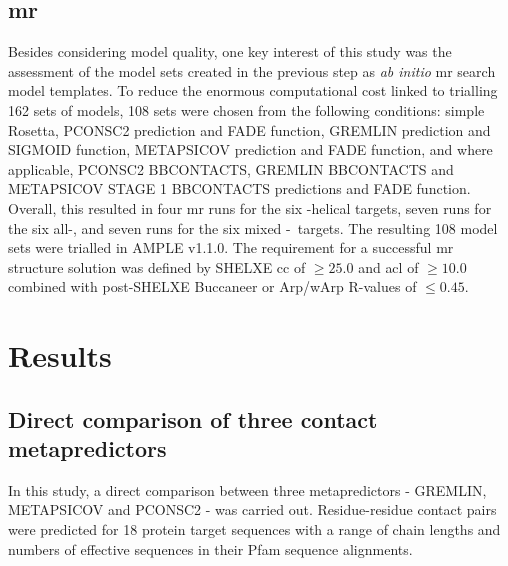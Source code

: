 \subsection{\acrlong{mr}}
Besides considering model quality, one key interest of this study was the assessment of the model sets created in the previous step as \textit{ab initio} \gls{mr} search model templates. To reduce the enormous computational cost linked to trialling 162 sets of models, 108 sets were chosen from the following conditions: simple Rosetta, PCONSC2 prediction and FADE function, GREMLIN prediction and SIGMOID function, METAPSICOV prediction and FADE function, and where applicable, PCONSC2 BBCONTACTS, GREMLIN BBCONTACTS and METAPSICOV STAGE 1 BBCONTACTS predictions and FADE function. Overall, this resulted in four \gls{mr} runs for the six \textalpha-helical targets, seven runs for the six all-\textbeta, and seven runs for the six mixed \textalpha-\textbeta\ targets. The resulting 108 model sets were trialled in AMPLE v1.1.0. The requirement for a successful \gls{mr} structure solution was defined by SHELXE \gls{cc} of $\geq25.0$ and \gls{acl} of $\geq10.0$ combined with post-SHELXE Buccaneer \cite{} or Arp/wArp \cite{} R-values of $\leq0.45$.

\section{Results}
\subsection{Direct comparison of three contact metapredictors}
In this study, a direct comparison between three metapredictors - GREMLIN, METAPSICOV and PCONSC2 - was carried out. Residue-residue contact pairs were predicted for 18 protein target sequences with a range of chain lengths and numbers of effective sequences in their Pfam sequence alignments.

